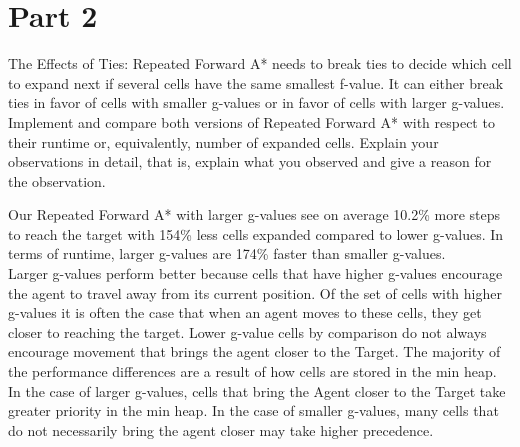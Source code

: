 \documentclass[12pt]{article}
\begin{document}
\section*{Part 2}
 \begin{itshape}
 The Effects of Ties: Repeated Forward A* needs to break ties to decide which cell to expand next if several cells have the same smallest f-value. It can either break ties in favor of cells with smaller g-values or in favor of cells with larger g-values. Implement and compare both versions of Repeated Forward A* with respect to their runtime or, equivalently, number of expanded cells. Explain your observations in detail, that is, explain what you observed and give a
reason for the observation.
 \end{itshape}
\begin {flushleft}
Our Repeated Forward A* with larger g-values see on average 10.2\% more steps to reach the
target with 154\% less cells expanded compared to lower g-values. In terms of runtime, larger
g-values are 174\% faster than smaller g-values.
\\ 
\vskip 0.3cm
Larger g-values perform better because cells that have higher g-values encourage the agent to
travel away from its current position. Of the set of cells with higher g-values it is often the case
that when an agent moves to these cells, they get closer to reaching the target. Lower g-value
cells by comparison do not always encourage movement that brings the agent closer to the
Target. The majority of the performance differences are a result of how cells are stored in the
min heap. In the case of larger g-values, cells that bring the Agent closer to the Target take
greater priority in the min heap. In the case of smaller g-values, many cells that do not
necessarily bring the agent closer may take higher precedence. 

\end{flushleft}
\end{document}
